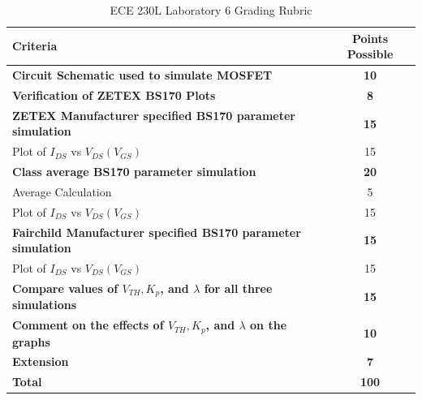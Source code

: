 \documentclass[12pt]{../manual}
\begin{document}
%
\newpage
\def\arraystretch{1.2}
{}
\hspace{0pt}
\vfill %
\begin{table}[ht!]
\caption{ECE 230L Laboratory 6 Grading Rubric}
\centering
\begin{tabular}{l|c} \hline
Criteria & Points Possible \\ \hline \hline
\textbf{Circuit Schematic used to simulate MOSFET}	& \textbf{10} \\ \hline
\textbf{Verification of ZETEX BS170 Plots}			& \textbf{8} \\ \hline
\textbf{ZETEX Manufacturer specified BS170 parameter simulation}		& \textbf{15} \\
Plot of $I_{DS}$ vs $V_{DS}(V_{GS})$ 				& 15 \\ \hline
\textbf{Class average BS170 parameter simulation}	& \textbf{20} \\
Average Calculation									& 5 \\ 
Plot of $I_{DS}$ vs $V_{DS}(V_{GS})$ 				& 15 \\ \hline
\textbf{Fairchild Manufacturer specified BS170 parameter simulation}		& \textbf{15} \\
Plot of $I_{DS}$ vs $V_{DS}(V_{GS})$ 				& 15 \\ \hline
\textbf{Compare values of $V_{TH}, K_p$, and $\lambda$ for all three simulations} & \textbf{15} \\ \hline
\textbf{Comment on the effects of $V_{TH}, K_p$, and $\lambda$ on the graphs} & \textbf{10} \\ \hline
{\bf Extension} 									& {\bf 7} \\ \hline \hline
{\bf Total}											& {\bf 100} \\ \hline
\end{tabular}
\end{table}
\vfill %
\end{document}
